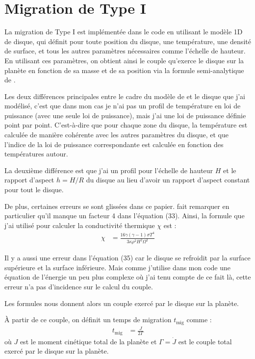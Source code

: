 \section{Migration de Type I}
La migration de Type I est implémentée dans le code en utilisant le modèle 1D de disque, qui définit pour toute position du disque, une température, une densité de surface, et tous les autres paramètres nécessaires comme l'échelle de hauteur. En utilisant ces paramètres, on obtient ainsi le couple qu'exerce le disque sur la planète en fonction de sa masse et de sa position via la formule semi-analytique de \cite{paardekooper2011torque}. 

Les deux différences principales entre le cadre du modèle de \cite{paardekooper2011torque} et le disque que j'ai modélisé, c'est que dans mon cas je n'ai pas un profil de température en loi de puissance (avec une seule loi de puissance), mais j'ai une loi de puissance définie point par point. C'est-à-dire que pour chaque zone du disque, la température est calculée de manière cohérente avec les autres paramètres du disque, et que l'indice de la loi de puissance correspondante est calculée en fonction des températures autour.

La deuxième différence est que j'ai un profil pour l'échelle de hauteur $H$ et le rapport d'aspect $h=H/R$ du disque au lieu d'avoir un rapport d'aspect constant pour tout le disque.

\bigskip

De plus, certaines erreurs se sont glissées dans ce papier. \cite[appendice A]{bitsch2011range} fait remarquer en particulier qu'il manque un facteur 4 dans l'équation (33). Ainsi, la formule que j'ai utilisé pour calculer la conductivité thermique $\chi$ est :
\begin{align}
\chi &= \frac{16\gamma (\gamma-1) \sigma T^4}{3\kappa \rho^2 H^2\Omega^2}
\end{align}

Il y a aussi une erreur dans l'équation (35) car le disque se refroidit par la surface supérieure et la surface inférieure. Mais comme j'utilise dans mon code une équation de l'énergie  un peu plus complexe où j'ai tenu compte de ce fait là, cette erreur n'a pas d'incidence sur le calcul du couple.

Les formules nous donnent alors un couple exercé par le disque sur la planète. 

À partir de ce couple, on définit un temps de migration $t_\text{mig}$ comme : 
\begin{align}
t_\text{mig} &= \frac{J}{2\Gamma}
\end{align}
où $J$ est le moment cinétique total de la planète et $\Gamma=\dot{J}$ est le couple total exercé par le disque sur la planète.

